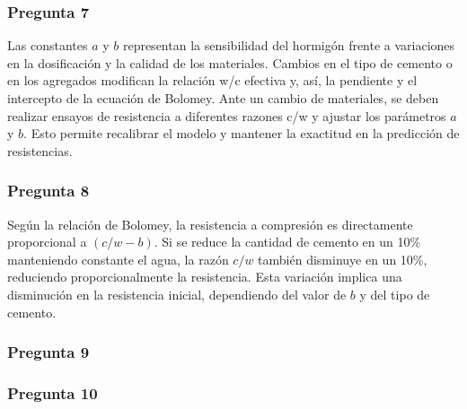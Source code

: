 \subsubsection*{Pregunta 7} 
Las constantes \( a \) y \( b \) representan la sensibilidad del hormigón frente a variaciones en la dosificación y la calidad de los materiales. Cambios en el tipo de cemento o en los agregados modifican la relación w/c efectiva y, así, la pendiente y el intercepto de la ecuación de Bolomey. Ante un cambio de materiales, se deben realizar ensayos de resistencia a diferentes razones c/w y ajustar los parámetros \( a \) y \( b \). Esto permite recalibrar el modelo y mantener la exactitud en la predicción de resistencias.

\subsubsection*{Pregunta 8} 
Según la relación de Bolomey, la resistencia a compresión es directamente proporcional a \((c/w - b)\). Si se reduce la cantidad de cemento en un 10\% manteniendo constante el agua, la razón \( c/w \) también disminuye en un 10\%, reduciendo proporcionalmente la resistencia. Esta variación implica una disminución en la resistencia inicial, dependiendo del valor de \( b \) y del tipo de cemento.

\subsubsection*{Pregunta 9} 

\subsubsection*{Pregunta 10} 




